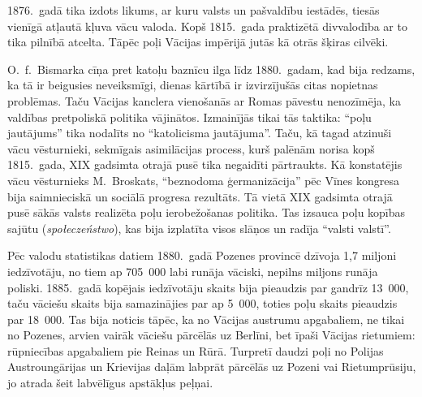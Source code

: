 \documentclass[twoside,a5paper,12pt,fleqn,openany]{extbook}
\newcommand{\pltxti}[1]{\textit{\textpolish{#1}}}
\begin{document}
1876.~gadā tika izdots likums, ar kuru valsts un pašvaldību iestādēs, tiesās vienīgā atļautā kļuva vācu valoda. Kopš 1815.~gada praktizētā divvalodība ar to tika pilnībā atcelta. Tāpēc poļi Vācijas impērijā jutās kā otrās šķiras cilvēki.

O.~f.~Bismarka cīņa pret katoļu baznīcu ilga līdz 1880.~gadam, kad bija redzams, ka tā ir beigusies neveiksmīgi, dienas kārtībā ir izvirzījušās citas nopietnas problēmas. Taču Vācijas kanclera vienošanās ar Romas pāvestu nenozīmēja, ka valdības pretpoliskā politika vājinātos. Izmainījās tikai tās taktika: ``poļu jautājums'' tika nodalīts no ``katolicisma jautājuma''. Taču, kā tagad atzinuši vācu vēsturnieki, sekmīgais asimilācijas process, kurš palēnām norisa kopš 1815.~gada, XIX gadsimta otrajā pusē tika negaidīti pārtraukts. Kā konstatējis vācu vēsturnieks M.~Broskats, ``beznodoma ģermanizācija'' pēc Vīnes kongresa bija saimnieciskā un sociālā progresa rezultāts. Tā vietā XIX gadsimta otrajā pusē sākās valsts realizēta poļu ierobežošanas politika. Tas izsauca poļu kopības sajūtu (\pltxti{społeczeństwo}), kas bija izplatīta visos slāņos un radīja ``valsti valstī''.

Pēc valodu statistikas datiem 1880.~gadā Pozenes provincē dzīvoja 1,7 miljoni iedzīvotāju, no tiem ap 705~000 labi runāja vāciski, nepilns miljons runāja poliski. 1885.~gadā kopējais iedzīvotāju skaits bija pieaudzis par gandrīz 13~000, taču vāciešu skaits bija samazinājies par ap 5~000, toties poļu skaits pieaudzis par 18~000. Tas bija noticis tāpēc, ka no Vācijas austrumu apgabaliem, ne tikai no Pozenes, arvien vairāk vāciešu pārcēlās uz Berlīni, bet īpaši Vācijas rietumiem: rūpniecības apgabaliem pie Reinas un Rūrā. Turpretī daudzi poļi no Polijas Austroungārijas un Krievijas daļām labprāt pārcēlās uz Pozeni vai Rietumprūsiju, jo atrada šeit labvēlīgus apstākļus peļņai.
\end{document}
